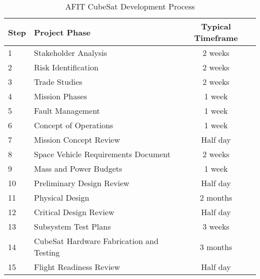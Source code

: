 \begin{table}[h!]
\centering
\begin{tabular}{|l|l|c|} 
 \hline
 Step & Project Phase & Typical Timeframe \\ [0.5ex] 
 \hline\hline
 1 & Stakeholder Analysis & 2 weeks\\
 2 & Risk Identification & 2 weeks\\
 3 & Trade Studies & 2 weeks\\
 4 & Mission Phases & 1 week\\
 5 & Fault Management & 1 week\\
 6 & Concept of Operations & 1 week\\
 7 & Mission Concept Review & Half day\\
 8 & Space Vehicle Requirements Document & 2 weeks\\
 9 & Mass and Power Budgets & 1 week\\
 10 & Preliminary Design Review & Half day\\
 11 & Physical Design & 2 months\\
 12 & Critical Design Review & Half day\\
 13 & Subsystem Test Plans & 3 weeks\\
 14 & CubeSat Hardware Fabrication and Testing & 3 months\\
 15 & Flight Readiness Review & Half day\\
 \hline
\end{tabular}
\caption{AFIT CubeSat Development Process}
\label{table:AFIT CubeSat Development Process}
\end{table}